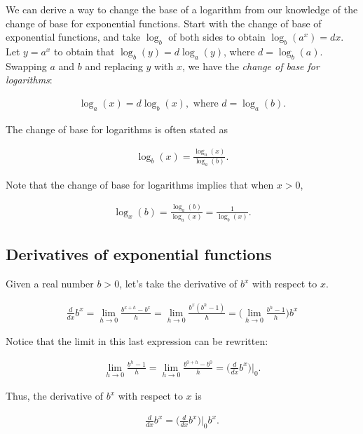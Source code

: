 We can derive a way to change the base of a logarithm from our knowledge of the change of base for exponential functions. Start with the change of base of exponential functions, and take $\log_b$ of both sides to obtain $\log_b(a^x) = dx$. Let $y = a^x$ to obtain that ${\log_b(y) = d\log_a(y)}$, where $d = \log_b(a)$. Swapping $a$ and $b$ and replacing $y$ with $x$, we have the \textit{change of base for logarithms}:

\begin{align*}
    \log_a(x) = d\log_b(x), \text{ where $d = \log_a(b)$}.
\end{align*}

The change of base for logarithms is often stated as

\begin{align*}
    \log_b(x) = \frac{\log_a(x)}{\log_a(b)}.
\end{align*}

Note that the change of base for logarithms implies that when $x > 0$,

\begin{align*}
    \log_x(b) = \frac{\log_a(b)}{\log_a(x)} = \frac{1}{\log_b(x)}.
\end{align*}

\subsection*{Derivatives of exponential functions}

Given a real number $b > 0$, let's take the derivative of $b^x$ with respect to $x$.

\begin{align*}
    \frac{d}{dx} b^x = \lim_{h \rightarrow 0} \frac{b^{x + h} - b^x}{h}
    = \lim_{h \rightarrow 0} \frac{b^x (b^h - 1)}{h}
    = \Big( \lim_{h \rightarrow 0} \frac{b^h - 1}{h} \Big) b^x
\end{align*}

Notice that the limit in this last expression can be rewritten:

\begin{align*}
    \lim_{h \rightarrow 0} \frac{b^h - 1}{h} = \lim_{h \rightarrow 0} \frac{b^{0 + h} - b^0}{h} = \Big( \frac{d}{dx} b^x \Big)\Big|_0.
\end{align*}

Thus, the derivative of $b^x$ with respect to $x$ is

\begin{align*}
   \frac{d}{dx} b^x = \Big( \frac{d}{dx} b^x \Big)\Big|_0 b^x.
\end{align*}

